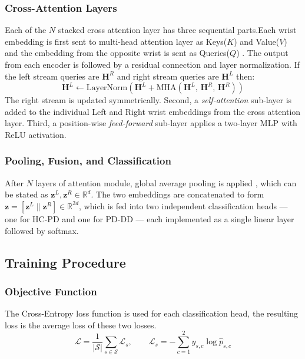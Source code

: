 \documentclass[conference]{IEEEtran}
\begin{document}
\subsubsection{Cross-Attention Layers}
Each of the $N$ stacked  cross attention layer has three sequential parts.Each wrist embedding is first sent to multi-head attention layer as Keys($K$) and Value($V$)  and the embedding from the opposite wrist is sent as Queries($Q$) . The output from each encoder is followed by a residual connection and layer normalization. If the left stream queries are $\mathbf{H}^R$ and right stream queries are $\mathbf{H}^L$ then: 
\begin{equation}
  \mathbf{H}^L \leftarrow \mathrm{LayerNorm}\!\left(
      \mathbf{H}^L + \mathrm{MHA}(\mathbf{H}^L,\, \mathbf{H}^R,\, \mathbf{H}^R)
  \right)
\end{equation}
The right stream is updated symmetrically. Second, a \emph{self-attention} sub-layer is added to the individual Left and Right wrist embeddings from the cross attention layer. Third, a position-wise \emph{feed-forward} sub-layer applies a two-layer MLP with ReLU activation.

\subsubsection{Pooling, Fusion, and Classification}
After $N$ layers of attention module, global average pooling is applied , which can be stated as $\mathbf{z}^L, \mathbf{z}^R \in \mathbb{R}^d$. The two embeddings are concatenated to form $\mathbf{z} = [\mathbf{z}^L \| \mathbf{z}^R] \in \mathbb{R}^{2d}$, which is fed into two independent classification heads --- one for HC-PD and one for PD-DD --- each implemented as a single linear layer followed by softmax.

\subsection{Training Procedure}

\subsubsection{Objective Function}
The Cross-Entropy loss function is used for each classification head, the resulting loss is the average loss of these two losses.
\begin{equation}
\mathcal{L} = \frac{1}{|\mathcal{S}|} \sum_{s \in \mathcal{S}} \mathcal{L}_s, \qquad
\mathcal{L}_s = -\sum_{c=1}^{2} y_{s,c} \log \hat{p}_{s,c}
\end{equation}
\end{document}
